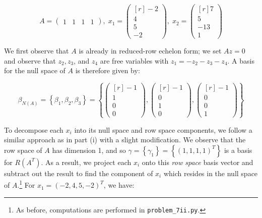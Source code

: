 $$
A = \begin{pmatrix}
  1 & 1 & 1 & 1
\end{pmatrix},\; x_1 = \begin{pmatrix*}[r]
  -2 \\
   4 \\
   5 \\
  -2
\end{pmatrix*},\; x_2 = \begin{pmatrix*}[r]
    7 \\
    5 \\
  -13 \\
    1
\end{pmatrix*}
$$

\begin{solution}
  We first observe that $A$ is already in reduced-row echelon form; we set $A z = 0$ and observe that $z_2, z_3$, 
  and $z_4$ are free variables with $z_1 = -z_2 - z_3 - z_4$. A basis for the null space of $A$ is therefore given by:

  $$
  \beta_{N(A)} = \left\{ \beta_1, \beta_2, \beta_3 \right\} = \left\{\begin{pmatrix*}[r]
    -1 \\
     1 \\
     0 \\
     0
  \end{pmatrix*},\begin{pmatrix*}[r]
    -1 \\
     0\\
     1 \\
     0
  \end{pmatrix*},\begin{pmatrix*}[r]
    -1 \\
     0\\
     0 \\
     1
  \end{pmatrix*}
  \right\}
  $$

  To decompose each ${x_i}$ into its null space and row space components, we follow a similar approach as in part (i) 
  with a slight modification. We observe that the row space of $A$ has dimension 1, and so
  $\gamma = \left\{ \gamma_1 \right\} = \left\{ (1, 1, 1, 1)^T \right\}$ is a basis for $R(A^T)$. As a result, we 
  project each $x_i$ onto this \textit{row space} basis vector and subtract out the result to find the component of $x_i$ 
  which resides in the null space of $A$.\footnote{
    As before, computations are performed in \texttt{problem\_7ii.py}.
  } For $x_1 = (-2, 4, 5, -2)^T$, we have:


\end{solution}
